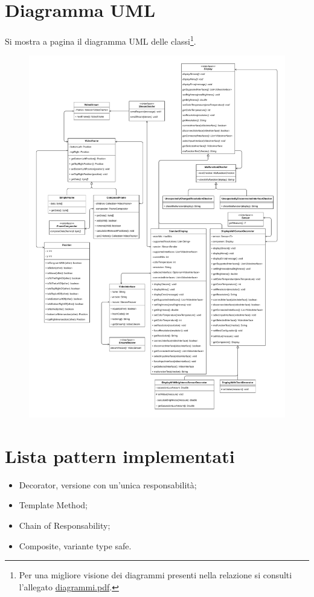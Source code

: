 \documentclass[a4paper,11pt]{article}
\begin{document}
	\section{Diagramma UML}
	Si mostra a pagina \pageref{fig:classdiagram} il diagramma UML delle classi\footnote{Per una migliore visione dei diagrammi presenti nella relazione si consulti l'allegato \href{../diagrammi.pdf}{diagrammi.pdf}.}.\\
	\begin{figure}[p]
		\noindent\includegraphics[width=\textwidth]{diagramma/ClassDiagramm-Types.pdf}
		\label{fig:classdiagram}
	\end{figure}
	
	\section{Lista pattern implementati}
	\begin{itemize}
		\item Decorator, versione con un'unica responsabilità;
		\item Template Method;
		\item Chain of Responsability;
		\item Composite, variante type safe.
	\end{itemize}
	
\end{document}
